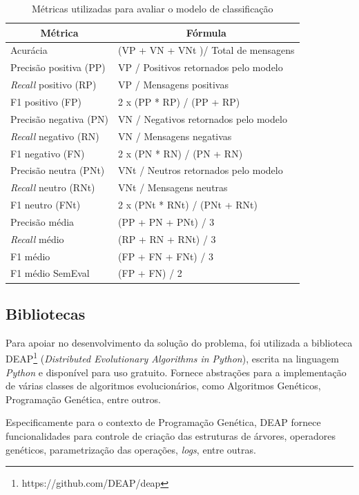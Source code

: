 \documentclass[12pt]{article}
\begin{document}
\begin{table}[H]
\centering
	\begin{tabular}{ll}
	\multicolumn{1}{c}{\textbf{Métrica}} & \multicolumn{1}{c}{\textbf{Fórmula}} \\ \hline
	Acurácia & (VP + VN + VNt )/ Total de mensagens \\ \hline
	Precisão positiva (PP) & VP / Positivos retornados pelo modelo \\ \hline
	\textit{Recall} positivo (RP) & VP / Mensagens positivas \\ \hline
	F1 positivo (FP) & 2 x (PP * RP) / (PP + RP) \\ \hline
	Precisão negativa (PN) & VN / Negativos retornados pelo modelo \\ \hline
	\textit{Recall} negativo (RN) & VN / Mensagens negativas \\ \hline
	F1 negativo (FN) & 2 x (PN * RN) / (PN + RN) \\ \hline
	Precisão neutra (PNt) & VNt / Neutros retornados pelo modelo \\ \hline
	\textit{Recall} neutro (RNt) & VNt / Mensagens neutras \\ \hline
	F1 neutro (FNt) & 2 x (PNt * RNt) / (PNt + RNt) \\ \hline
	Precisão média & (PP + PN + PNt) / 3 \\ \hline
	\emph{Recall} médio & (RP + RN + RNt) / 3 \\ \hline	
	F1 médio & (FP + FN + FNt) / 3 \\ \hline
	F1 médio SemEval & (FP + FN) / 2 \\ \hline	
	\end{tabular}
	\caption{Métricas utilizadas para avaliar o modelo de classificação}
	\label{metrics}
\end{table}

\subsection{Bibliotecas}

Para apoiar no desenvolvimento da solução do problema, foi utilizada a biblioteca DEAP\footnote{https://github.com/DEAP/deap} (\emph{Distributed Evolutionary Algorithms in Python}), escrita na linguagem \emph{Python} e disponível para uso gratuito. Fornece abstrações para a implementação de várias classes de algoritmos evolucionários, como Algoritmos Genéticos, Programação Genética, entre outros. \cite{DEAP_JMLR2012}

Especificamente para o contexto de Programação Genética, DEAP fornece funcionalidades para controle de criação das estruturas de árvores, operadores genéticos, parametrização das operações, \emph{logs}, entre outras.
\end{document}
